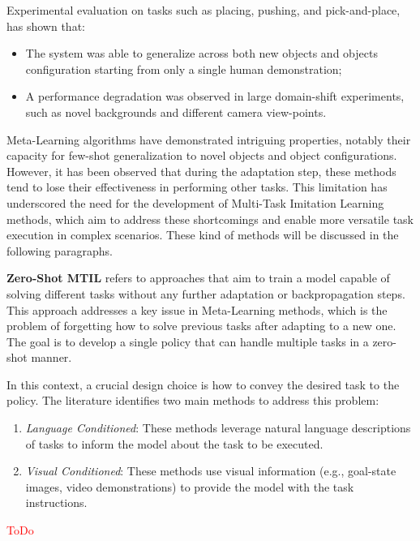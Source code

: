 
\newline Experimental evaluation on tasks such as placing, pushing, and pick-and-place, has shown that: \begin{itemize}
    \item The system was able to generalize across both new objects and objects configuration starting from only a single human demonstration;
    \item A performance degradation was observed in large domain-shift experiments, such as novel backgrounds and different camera view-points.
\end{itemize}


Meta-Learning algorithms have demonstrated intriguing properties, notably their capacity for few-shot generalization to novel objects and object configurations. However, it has been observed that during the adaptation step, these methods tend to lose their effectiveness in performing other tasks. This limitation has underscored the need for the development of Multi-Task Imitation Learning methods, which aim to address these shortcomings and enable more versatile task execution in complex scenarios. These kind of methods will be discussed in the following paragraphs.

\textbf{Zero-Shot MTIL} refers to approaches that aim to train a model capable of solving different tasks without any further adaptation or backpropagation steps. This approach addresses a key issue in Meta-Learning methods, which is the problem of forgetting how to solve previous tasks after adapting to a new one. The goal is to develop a single policy that can handle multiple tasks in a zero-shot manner.

In this context, a crucial design choice is how to convey the desired task to the policy. The literature identifies two main methods to address this problem:

\begin{enumerate}
    \item \textit{Language Conditioned}: These methods leverage natural language descriptions of tasks to inform the model about the task to be executed.
    \item \textit{Visual Conditioned}: These methods use visual information (e.g., goal-state images, video demonstrations) to provide the model with the task instructions.
\end{enumerate}
\textcolor{red}{ToDo}


